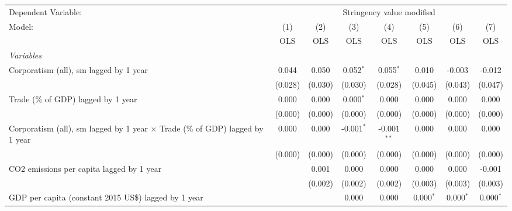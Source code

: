 
\begingroup
\centering
\begin{tabular}{lccccccc}
   \toprule
   Dependent Variable: & \multicolumn{7}{c}{Stringency value modified}\\
   Model:                                                                               & (1)     & (2)     & (3)          & (4)           & (5)         & (6)          & (7)\\  
                                                                                        &  OLS    & OLS     & OLS          & OLS           & OLS         & OLS          & OLS\\  
   \midrule
   \emph{Variables}\\
   Corporatism (all), sm lagged by 1 year                                               & 0.044   & 0.050   & 0.052$^{*}$  & 0.055$^{*}$   & 0.010       & -0.003       & -0.012\\   
                                                                                        & (0.028) & (0.030) & (0.030)      & (0.028)       & (0.045)     & (0.043)      & (0.047)\\   
   Trade (\% of GDP) lagged by 1 year                                                   & 0.000   & 0.000   & 0.000$^{*}$  & 0.000         & 0.000       & 0.000        & 0.000\\   
                                                                                        & (0.000) & (0.000) & (0.000)      & (0.000)       & (0.000)     & (0.000)      & (0.000)\\   
   Corporatism (all), sm lagged by 1 year $\times$ Trade (\% of GDP) lagged by 1 year   & 0.000   & 0.000   & -0.001$^{*}$ & -0.001$^{**}$ & 0.000       & 0.000        & 0.000\\   
                                                                                        & (0.000) & (0.000) & (0.000)      & (0.000)       & (0.000)     & (0.000)      & (0.000)\\   
   CO2 emissions per capita lagged by 1 year                                            &         & 0.001   & 0.000        & 0.000         & 0.000       & 0.000        & -0.001\\   
                                                                                        &         & (0.002) & (0.002)      & (0.002)       & (0.003)     & (0.003)      & (0.003)\\   
   GDP per capita (constant 2015 US\$) lagged by 1 year                                 &         &         & 0.000        & 0.000         & 0.000$^{*}$ & 0.000$^{*}$  & 0.000$^{*}$\\   

\end{tabular}
